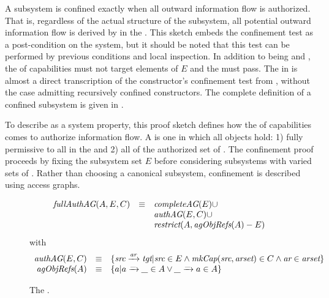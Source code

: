 A subsystem is confined exactly when all outward information flow is authorized.
That is, regardless of the actual structure of the subsystem, all potential outward information flow is derived by \TMcaps{} in the \term{\TMauthorizedSet}.
This sketch embeds the confinement test as a post-condition on the system, but it should be noted that this test can be performed by previous conditions and local inspection.
In addition to being \TMextant{} and \TMconstructive{}, the \TMauthorizedSet{} of capabilities must not target elements of \(E\) and the \TMconfinementTest{} must pass.
The \TMconfinementTest{} in  is almost a direct transcription of the constructor's confinement test from , without the case admitting recursively confined constructors.
The complete definition of a confined subsystem is given in .

To describe \TMconfinement{} as a system property, this proof sketch defines how the \TMauthorizedSet{} of capabilities comes to authorize information flow.
A  is one in which all objects hold: 1) fully permissive \TMcaps{} to all \TMobjs{} in the \TMsubsystem{} and 2) all of the authorized set of \TMcaps{}.
The confinement proof proceeds by fixing the subsystem set \(E\) before considering subsystems with varied sets of \TMobjs{}.
Rather than choosing a canonical subsystem, confinement is described using access graphs.

\begin{figure}
  \[
  \begin{array}{rcl}
    \FNfullAuthAG{A}{E}{C} & \equiv & \FNcompleteAG{E} \cup \\
    & & \FNauthAG{E}{C} \cup \\
    & & \FNrestrict{A}{\FNagNodes{A} - E}
  \end{array}
  \]
  with
  \[
  \begin{array}{rcl}
    \FNauthAG{E}{C} & \equiv & \{ \mkEdge{\ident{src}}{\ident{tgt}}{\ident{ar}} | \ident{src} \in E \wedge \FNmkCap{\ident{src}}{\ident{arset}} \in C \wedge \ident{ar} \in \ident{arset} \}\\
    \FNagNodes{A} & \equiv & \{ a | \mkEdge{a}{\ident{\_}}{\ident{\_}} \in A \vee \mkEdge{\ident{\_}}{a}{\ident{\_}} \in A \} \\
  \end{array}
  \]
  \caption{The \TMfullAuthAG{}. \label{fig:sketch:fullAuthAG}}
\end{figure}

